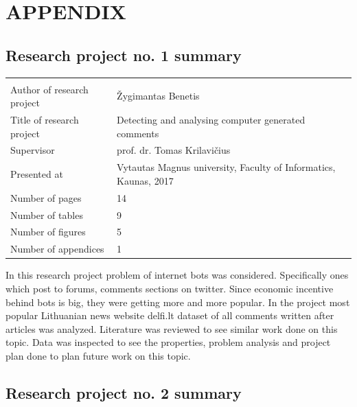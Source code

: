 \documentclass[a4paper,12pt]{article}
\begin{document}
	\appendix
	\section{APPENDIX}
	
	\subsection{Research project no. 1 summary}
	
	
	\noindent
	\begin{center}
		\begin{tabular}{L{4.5cm} L{8cm}}
			\\ 
			Author of research project & Žygimantas Benetis \\
			Title of research project & Detecting and analysing computer generated comments\\
			Supervisor & prof. dr. Tomas Krilavičius\\
			Presented at & Vytautas Magnus university, Faculty of Informatics, Kaunas, 2017\\
			Number of pages & 14\\
			Number of tables & 9\\
			Number of figures & 5\\
			Number of appendices & 1\\
		\end{tabular}
	\end{center} 
	
	\vspace{5mm}
	
	In this research project problem of internet bots was considered. Specifically ones which post to forums, comments sections on twitter. Since economic incentive behind bots is big, they were getting more and more popular. In the project most popular Lithuanian news website delfi.lt dataset of all comments written after articles was analyzed. Literature was reviewed to see similar work done on this topic. Data was inspected to see the properties, problem analysis and project plan done to plan future work on this topic. 
	
	\clearpage
	
	\subsection{Research project no. 2 summary}
	
\end{document}
